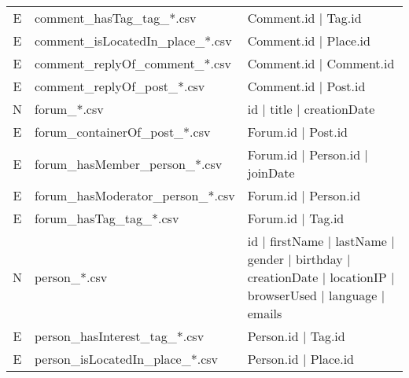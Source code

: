 \begin{table}[htb]
\begin{tabular}{|c|p{4.6cm}|p{11.4cm}|}
        E                       & comment\_hasTag\_tag\_*.csv             & Comment.id | Tag.id                                                                                         \\ 
        E                       & comment\_isLocatedIn\_place\_*.csv      & Comment.id | Place.id                                                                                       \\ 
        E                       & comment\_replyOf\_comment\_*.csv        & Comment.id | Comment.id                                                                                     \\ 
        E                       & comment\_replyOf\_post\_*.csv           & Comment.id | Post.id                                                                                        \\
		\hline
        N                       & forum\_*.csv                            & id | title | creationDate                                                                                   \\
        E                       & forum\_containerOf\_post\_*.csv         & Forum.id | Post.id                                                                                          \\
        E                       & forum\_hasMember\_person\_*.csv         & Forum.id | Person.id | joinDate                                                                             \\
        E                       & forum\_hasModerator\_person\_*.csv      & Forum.id | Person.id                                                                                        \\
        E                       & forum\_hasTag\_tag\_*.csv               & Forum.id | Tag.id                                                                                           \\
		\hline
        N                       & person\_*.csv                           & id | firstName | lastName | gender | birthday | creationDate | locationIP | browserUsed | language | emails \\
        E                       & person\_hasInterest\_tag\_*.csv         & Person.id | Tag.id                                                                                          \\
        E                       & person\_isLocatedIn\_place\_*.csv       & Person.id | Place.id                                                                                        \\

\end{tabular}
\end{table}
